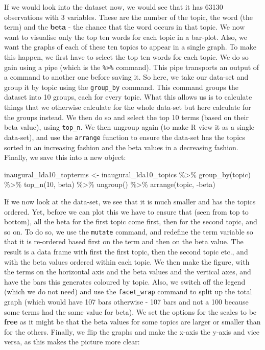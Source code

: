 \documentclass[
]{book}
\newenvironment{Shaded}{\begin{snugshade}}{\end{snugshade}}
\newcommand{\DecValTok}[1]{\textcolor[rgb]{0.00,0.00,0.81}{#1}}
\newcommand{\FunctionTok}[1]{\textcolor[rgb]{0.00,0.00,0.00}{#1}}
\newcommand{\NormalTok}[1]{#1}
\newcommand{\OtherTok}[1]{\textcolor[rgb]{0.56,0.35,0.01}{#1}}
\newcommand{\SpecialCharTok}[1]{\textcolor[rgb]{0.00,0.00,0.00}{#1}}
\begin{document}
If we would look into the dataset now, we would see that it has 63130 observations with 3 variables. These are the number of the topic, the word (the term) and the \textbf{beta} - the chance that the word occurs in that topic. We now want to visualise only the top ten words for each topic in a bar-plot. Also, we want the graphs of each of these ten topics to appear in a single graph. To make this happen, we first have to select the top ten words for each topic. We do so gain using a pipe (which is the \texttt{\%\textgreater{}\%} command). This pipe transports an output of a command to another one before saving it. So here, we take our data-set and group it by topic using the \texttt{group\_by} command. This command groups the dataset into 10 groups, each for every topic. What this allows us is to calculate things that we otherwise calculate for the whole data-set but here calculate for the groups instead. We then do so and select the top 10 terms (based on their beta value), using \texttt{top\_n}. We then ungroup again (to make R view it as a single data-set), and use the \texttt{arrange} function to ensure the data-set has the topics sorted in an increasing fashion and the beta values in a decreasing fashion. Finally, we save this into a new object:

\begin{Shaded}
\begin{Highlighting}[]
\NormalTok{inaugural\_lda10\_topterms }\OtherTok{\textless{}{-}}\NormalTok{ inaugural\_lda10\_topics }\SpecialCharTok{\%\textgreater{}\%}
    \FunctionTok{group\_by}\NormalTok{(topic) }\SpecialCharTok{\%\textgreater{}\%}
    \FunctionTok{top\_n}\NormalTok{(}\DecValTok{10}\NormalTok{, beta) }\SpecialCharTok{\%\textgreater{}\%}
    \FunctionTok{ungroup}\NormalTok{() }\SpecialCharTok{\%\textgreater{}\%}
    \FunctionTok{arrange}\NormalTok{(topic, }\SpecialCharTok{{-}}\NormalTok{beta)}
\end{Highlighting}
\end{Shaded}

If we now look at the data-set, we see that it is much smaller and has the topics ordered. Yet, before we can plot this we have to ensure that (seen from top to bottom), all the beta for the first topic come first, then for the second topic, and so on. To do so, we use the \texttt{mutate} command, and redefine the term variable so that it is re-ordered based first on the term and then on the beta value. The result is a data frame with first the first topic, then the second topic etc., and with the beta values ordered within each topic. We then make the figure, with the terms on the horizontal axis and the beta values and the vertical axes, and have the bars this generates coloured by topic. Also, we switch off the legend (which we do not need) and use the \texttt{facet\_wrap} command to split up the total graph (which would have 107 bars otherwise - 107 bars and not a 100 because some terms had the same value for beta). We set the options for the scales to be \textbf{free} as it might be that the beta values for some topics are larger or smaller than for the others. Finally, we flip the graphs and make the x-axis the y-axis and vice versa, as this makes the picture more clear:
\end{document}
